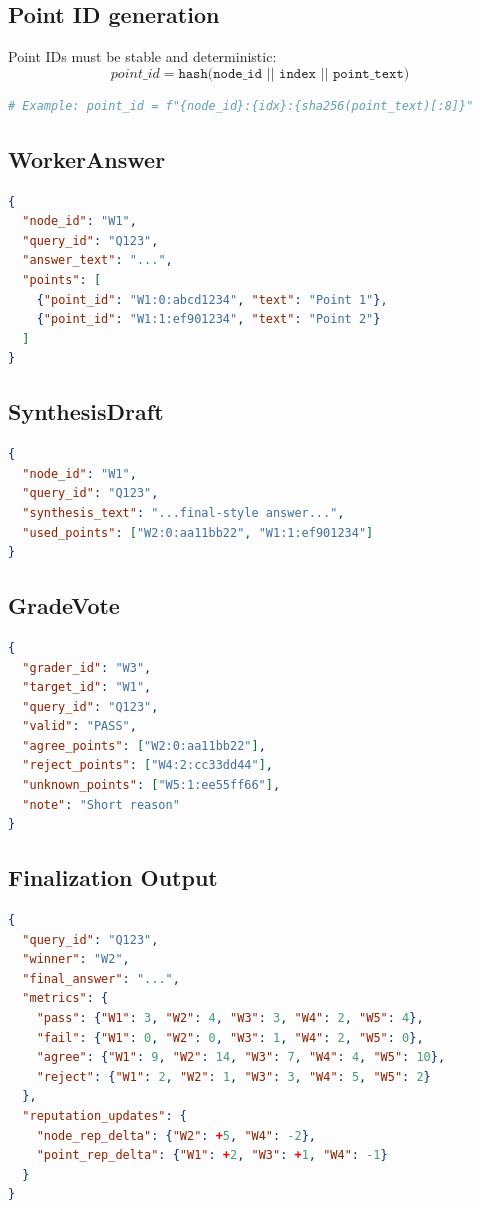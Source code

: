 \documentclass[11pt]{article}
\begin{document}
\subsection{Point ID generation}
Point IDs must be stable and deterministic:
\[
point\_id = \texttt{hash(node\_id || index || point\_text)}
\]
\begin{lstlisting}[language=python]
# Example: point_id = f"{node_id}:{idx}:{sha256(point_text)[:8]}"
\end{lstlisting}

\subsection{WorkerAnswer}
\begin{lstlisting}[language=json]
{
  "node_id": "W1",
  "query_id": "Q123",
  "answer_text": "...",
  "points": [
    {"point_id": "W1:0:abcd1234", "text": "Point 1"},
    {"point_id": "W1:1:ef901234", "text": "Point 2"}
  ]
}
\end{lstlisting}

\subsection{SynthesisDraft}
\begin{lstlisting}[language=json]
{
  "node_id": "W1",
  "query_id": "Q123",
  "synthesis_text": "...final-style answer...",
  "used_points": ["W2:0:aa11bb22", "W1:1:ef901234"]
}
\end{lstlisting}

\subsection{GradeVote}
\begin{lstlisting}[language=json]
{
  "grader_id": "W3",
  "target_id": "W1",
  "query_id": "Q123",
  "valid": "PASS",
  "agree_points": ["W2:0:aa11bb22"],
  "reject_points": ["W4:2:cc33dd44"],
  "unknown_points": ["W5:1:ee55ff66"],
  "note": "Short reason"
}
\end{lstlisting}

\subsection{Finalization Output}
\begin{lstlisting}[language=json]
{
  "query_id": "Q123",
  "winner": "W2",
  "final_answer": "...",
  "metrics": {
    "pass": {"W1": 3, "W2": 4, "W3": 3, "W4": 2, "W5": 4},
    "fail": {"W1": 0, "W2": 0, "W3": 1, "W4": 2, "W5": 0},
    "agree": {"W1": 9, "W2": 14, "W3": 7, "W4": 4, "W5": 10},
    "reject": {"W1": 2, "W2": 1, "W3": 3, "W4": 5, "W5": 2}
  },
  "reputation_updates": {
    "node_rep_delta": {"W2": +5, "W4": -2},
    "point_rep_delta": {"W1": +2, "W3": +1, "W4": -1}
  }
}
\end{lstlisting}
\end{document}
